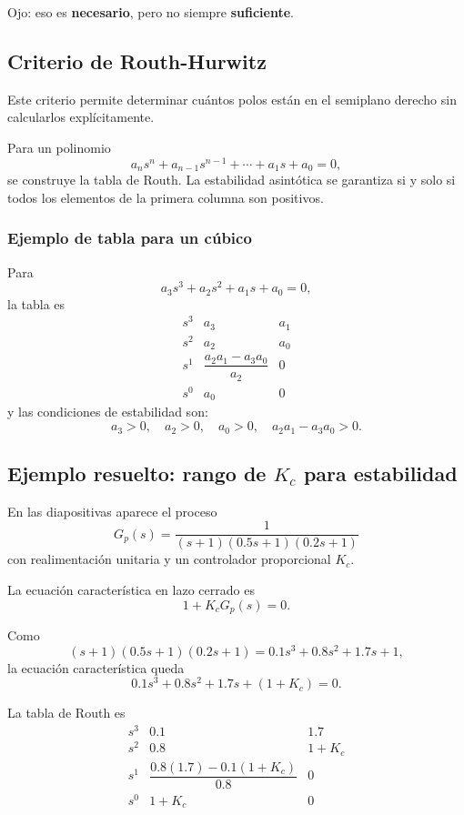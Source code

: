 \documentclass[11pt]{article}
\begin{document}
Ojo: eso es \textbf{necesario}, pero no siempre \textbf{suficiente}.

\subsection{Criterio de Routh-Hurwitz}
Este criterio permite determinar cu\'antos polos est\'an en el semiplano derecho sin calcularlos expl\'icitamente.

Para un polinomio
\[
a_ns^n+a_{n-1}s^{n-1}+\cdots+a_1s+a_0=0,
\]
se construye la tabla de Routh. La estabilidad asint\'otica se garantiza si y solo si todos los elementos de la primera columna son positivos.

\subsubsection{Ejemplo de tabla para un c\'ubico}
Para
\[
a_3s^3+a_2s^2+a_1s+a_0=0,
\]
la tabla es
\[
\begin{array}{c|cc}
s^3 & a_3 & a_1\\
s^2 & a_2 & a_0\\
s^1 & \dfrac{a_2a_1-a_3a_0}{a_2} & 0\\
s^0 & a_0 & 0
\end{array}
\]
y las condiciones de estabilidad son:
\[
a_3>0,\quad a_2>0,\quad a_0>0,\quad a_2a_1-a_3a_0>0.
\]

\subsection{Ejemplo resuelto: rango de $K_c$ para estabilidad}
En las diapositivas aparece el proceso
\begin{equation}
G_p(s)=\frac{1}{(s+1)(0.5s+1)(0.2s+1)}
\end{equation}
con realimentaci\'on unitaria y un controlador proporcional $K_c$.

La ecuaci\'on caracter\'istica en lazo cerrado es
\[
1+K_cG_p(s)=0.
\]

Como
\[
(s+1)(0.5s+1)(0.2s+1)=0.1s^3+0.8s^2+1.7s+1,
\]
la ecuaci\'on caracter\'istica queda
\begin{equation}
0.1s^3+0.8s^2+1.7s+(1+K_c)=0.
\label{eq:cubic_example}
\end{equation}

La tabla de Routh es
\[
\begin{array}{c|cc}
s^3 & 0.1 & 1.7\\
s^2 & 0.8 & 1+K_c\\
s^1 & \dfrac{0.8(1.7)-0.1(1+K_c)}{0.8} & 0\\
s^0 & 1+K_c & 0
\end{array}
\]
\end{document}
